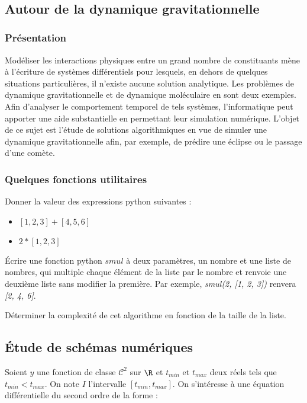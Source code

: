 \exer{[EQD-001]}
\setcounter{numques}{0}~\\

\subsection*{Autour de la dynamique gravitationnelle}

\subsubsection*{Présentation}
Modéliser les interactions physiques entre un grand nombre de constituants mène à l'écriture de systèmes différentiels pour lesquels, en dehors de quelques situations particulières, il n'existe aucune solution analytique. Les problèmes de dynamique gravitationnelle et de dynamique moléculaire en sont deux exemples. Afin d'analyser le comportement temporel de tels systèmes, l'informatique peut apporter une aide substantielle en permettant leur simulation numérique. L'objet de ce sujet est l'étude de solutions algorithmiques en vue de simuler une dynamique gravitationnelle afin, par exemple, de prédire une éclipse ou le passage d'une comète.

\subsubsection*{Quelques fonctions utilitaires}

\question{}Donner la valeur des expressions python suivantes :
\begin{itemize}
\item $[1, 2, 3] + [4, 5, 6]$
\item $2 * [1, 2, 3]$
\end{itemize}


\question{} Écrire une fonction python $smul$ à deux paramètres, un nombre et une liste de nombres, qui multiple chaque élément de la liste par le nombre et renvoie une deuxième liste sans modifier la première. 
Par exemple, \textit{smul(2, [1, 2, 3])} renvera \textit{[2, 4, 6]}.

\question{} Déterminer la complexité de cet algorithme en fonction de la taille de la liste.


\subsection*{Étude de schémas numériques}

Soient $y$ une fonction de classe $\mathcal{C}^2$ sur $\R$ et $t_{min}$ et $t_{max}$ deux réels tels que $t_{min} < t_{max}$. On note $I$ l'intervalle $\left[t_{min}, t_{max}\right]$. 
On s'intéresse à une équation différentielle du second ordre de la forme :

